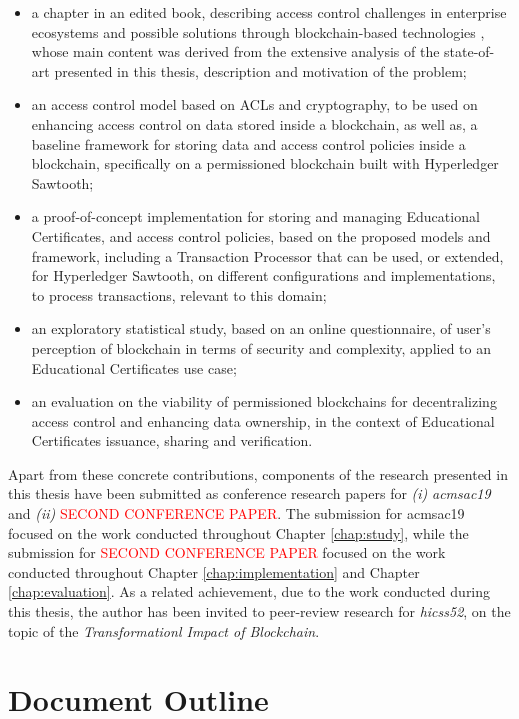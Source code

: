 \begin{itemize}
	\item a chapter in an edited book, describing access control challenges in enterprise ecosystems and possible solutions through blockchain-based technologies \cite{bryan_christiansen_access_2018}, whose main content was derived from the extensive analysis of the state-of-art presented in this thesis, description and motivation of the problem;
	\item an access control model based on ACLs and cryptography, to be used on enhancing access control on data stored inside a blockchain, as well as, a baseline framework for storing data and access control policies inside a blockchain, specifically on a permissioned blockchain built with Hyperledger Sawtooth;
	\item a proof-of-concept implementation for storing and managing Educational Certificates, and access control policies, based on the proposed models and framework, including a Transaction Processor that can be used, or extended, for Hyperledger Sawtooth, on different configurations and implementations, to process transactions, relevant to this domain;
	\item an exploratory statistical study, based on an online questionnaire, of user's perception of blockchain in terms of security and complexity, applied to an Educational Certificates use case;
	\item an evaluation on the viability of permissioned blockchains for decentralizing access control and enhancing data ownership, in the context of Educational Certificates issuance, sharing and verification.
\end{itemize}

Apart from these concrete contributions, components of the research presented in this thesis have been submitted as conference research papers for \emph{(i)} \textit{\gls{acmsac19}} and \emph{(ii)} \textcolor{red}{SECOND CONFERENCE PAPER}. The submission for \gls{acmsac19} focused on the work conducted throughout Chapter \ref{chap:study}, while the submission for \textcolor{red}{SECOND CONFERENCE PAPER} focused on the work conducted throughout Chapter \ref{chap:implementation} and Chapter \ref{chap:evaluation}. As a related achievement, due to the work conducted during this thesis, the author has been invited to peer-review research for \textit{\glsdesc{hicss52}}, on the topic of the \textit{Transformationl Impact of Blockchain}.

\section{Document Outline}

